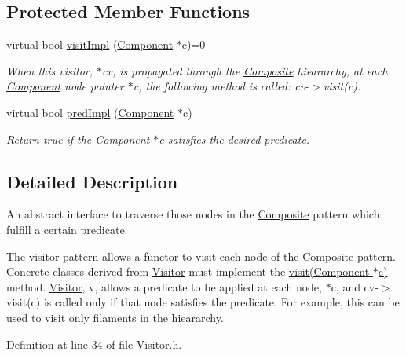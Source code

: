 \subsection*{Protected Member Functions}
\begin{DoxyCompactItemize}
\item 
virtual bool \hyperlink{classVisitor_a1ebdba266c77626f67a22fc2300d8dc3}{visit\+Impl} (\hyperlink{classComponent}{Component} $\ast$c)=0
\begin{DoxyCompactList}\small\item\em When this visitor, $\ast$cv, is propagated through the \hyperlink{classComposite}{Composite} hieararchy, at each \hyperlink{classComponent}{Component} node pointer $\ast$c, the following method is called\+: cv-\/$>$visit(c). \end{DoxyCompactList}\item 
virtual bool \hyperlink{classVisitor_a5f9d231f1ac00bd232085ee6e6547de0}{pred\+Impl} (\hyperlink{classComponent}{Component} $\ast$c)
\begin{DoxyCompactList}\small\item\em Return true if the \hyperlink{classComponent}{Component} $\ast$c satisfies the desired predicate. \end{DoxyCompactList}\end{DoxyCompactItemize}


\subsection{Detailed Description}
An abstract interface to traverse those nodes in the \hyperlink{classComposite}{Composite} pattern which fulfill a certain predicate. 

The visitor pattern allows a functor to visit each node of the \hyperlink{classComposite}{Composite} pattern. Concrete classes derived from \hyperlink{classVisitor}{Visitor} must implement the \hyperlink{classVisitor_a3f8ea7ad6aa61e99d8d1bc0576bdf23c}{visit(\+Component $\ast$c)} method. \hyperlink{classVisitor}{Visitor}, v, allows a predicate to be applied at each node, $\ast$c, and cv-\/$>$visit(c) is called only if that node satisfies the predicate. For example, this can be used to visit only filaments in the hieararchy. 

Definition at line 34 of file Visitor.\+h.



